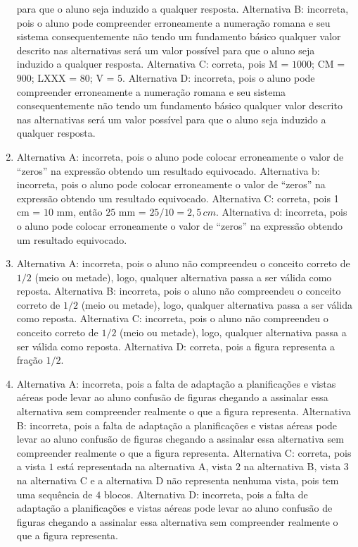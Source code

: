 \begin{enumerate}
para que o aluno seja induzido a qualquer resposta.
Alternativa B: incorreta, pois o aluno pode compreender erroneamente a
numeração romana e seu sistema consequentemente não tendo um fundamento
básico qualquer valor descrito nas alternativas será um valor possível
para que o aluno seja induzido a qualquer resposta.
Alternativa C: correta, pois M = $1000$; CM = $900$; LXXX = $80$; V = $5$.
Alternativa D: incorreta, pois o aluno pode compreender erroneamente a
numeração romana e seu sistema consequentemente não tendo um fundamento
básico qualquer valor descrito nas alternativas será um valor possível
para que o aluno seja induzido a qualquer resposta.
\item Alternativa A: incorreta, pois o aluno pode colocar erroneamente o valor
de ``zeros'' na expressão obtendo um resultado equivocado.
Alternativa b: incorreta, pois o aluno pode colocar erroneamente o valor
de ``zeros'' na expressão obtendo um resultado equivocado.
Alternativa C: correta, pois 1 cm = $10$ mm, então $25$ mm = $25 / 10 = 2,5\,cm$.
Alternativa d: incorreta, pois o aluno pode colocar erroneamente o valor
de ``zeros'' na expressão obtendo um resultado equivocado.
\item Alternativa A: incorreta, pois o aluno não compreendeu o conceito
correto de $1/2$ (meio ou metade), logo, qualquer alternativa passa a ser
válida como reposta.
Alternativa B: incorreta, pois o aluno não compreendeu o conceito
correto de $1/2$ (meio ou metade), logo, qualquer alternativa passa a ser
válida como reposta.
Alternativa C: incorreta, pois o aluno não compreendeu o conceito
correto de $1/2$ (meio ou metade), logo, qualquer alternativa passa a ser
válida como reposta.
Alternativa D: correta, pois a figura representa a fração $1/2$.
\item Alternativa A: incorreta, pois a falta de adaptação a planificações e
vistas aéreas pode levar ao aluno confusão de figuras chegando a
assinalar essa alternativa sem compreender realmente o que a figura
representa.
Alternativa B: incorreta, pois a falta de adaptação a planificações e
vistas aéreas pode levar ao aluno confusão de figuras chegando a
assinalar essa alternativa sem compreender realmente o que a figura
representa.
Alternativa C: correta, pois a vista $1$ está representada na alternativa
A, vista $2$ na alternativa B, vista $3$ na alternativa C e a alternativa D
não representa nenhuma vista, pois tem uma sequência de $4$ blocos.
Alternativa D: incorreta, pois a falta de adaptação a planificações e
vistas aéreas pode levar ao aluno confusão de figuras chegando a
assinalar essa alternativa sem compreender realmente o que a figura
representa.
\end{enumerate}

